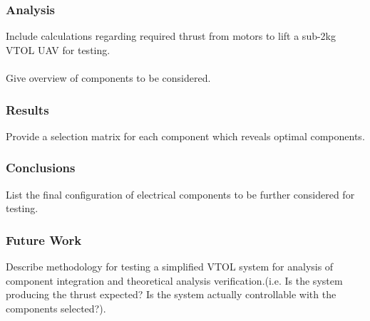 \subsubsection{Analysis}
Include calculations regarding required thrust from motors to lift a sub-2kg VTOL UAV for testing.\\
\\
Give overview of components to be considered.
\subsubsection{Results}
Provide a selection matrix for each component which reveals optimal components.
\subsubsection{Conclusions}
List the final configuration of electrical components to be further considered for testing.
\subsubsection{Future Work}
Describe methodology for testing a simplified VTOL system for analysis of component integration and theoretical analysis verification.(i.e. Is the system producing the thrust expected? Is the system actually controllable with the components selected?). 